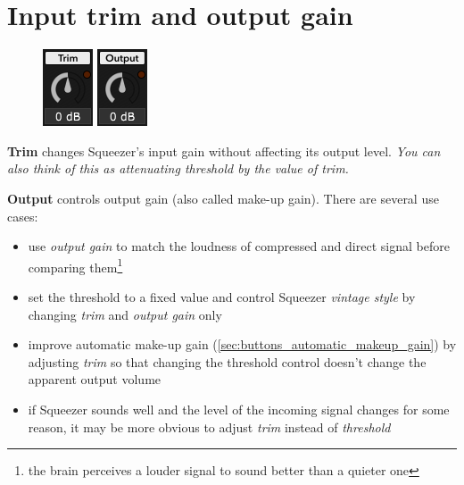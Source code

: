 \section{Input trim and output gain}
\label{sec:input_trim_and_output_gain}

\begin{figure}
  \includegraphics[scale=\screenshotscale,clip]{include/images/knob_input_trim.png}
  \includegraphics[scale=\screenshotscale,clip]{include/images/knob_output_gain.png}
\end{figure}

\textbf{Trim} changes Squeezer's input gain without affecting its
output level.  \emph{You can also think of this as attenuating
  threshold by the value of trim.}

\textbf{Output} controls output gain (also called make-up gain).
There are several use cases:

\begin{itemize}
\item use \emph{output gain} to match the loudness of compressed and
  direct signal before comparing them\footnote{the brain perceives a
    louder signal to sound better than a quieter one}

\item set the threshold to a fixed value and control Squeezer
  \emph{vintage style} by changing \emph{trim} and \emph{output gain}
  only

\item improve automatic make-up gain
  (\ref{sec:buttons_automatic_makeup_gain}) by adjusting \emph{trim}
  so that changing the threshold control doesn't change the apparent
  output volume

\item if Squeezer sounds well and the level of the incoming signal
  changes for some reason, it may be more obvious to adjust
  \emph{trim} instead of \emph{threshold}
\end{itemize}

